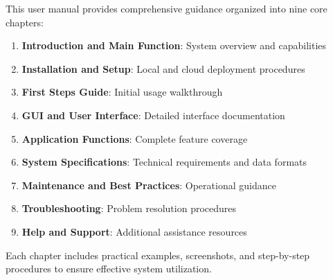 This user manual provides comprehensive guidance organized into nine core chapters:

\begin{enumerate}
    \item \textbf{Introduction and Main Function}: System overview and capabilities
    \item \textbf{Installation and Setup}: Local and cloud deployment procedures
    \item \textbf{First Steps Guide}: Initial usage walkthrough
    \item \textbf{GUI and User Interface}: Detailed interface documentation
    \item \textbf{Application Functions}: Complete feature coverage
    \item \textbf{System Specifications}: Technical requirements and data formats
    \item \textbf{Maintenance and Best Practices}: Operational guidance
    \item \textbf{Troubleshooting}: Problem resolution procedures
    \item \textbf{Help and Support}: Additional assistance resources
\end{enumerate}

Each chapter includes practical examples, screenshots, and step-by-step procedures to ensure effective system utilization.